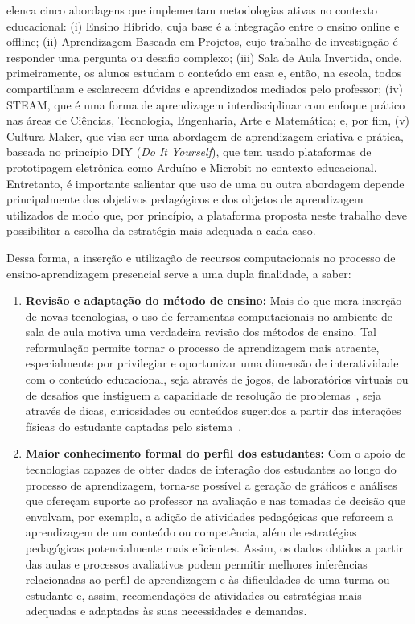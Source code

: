 \cite{Andrade:2018} elenca cinco abordagens que implementam metodologias ativas no contexto educacional: (i) Ensino Híbrido, cuja base é a integração entre o ensino online e offline; (ii) Aprendizagem Baseada em Projetos, cujo trabalho de investigação é responder uma pergunta ou desafio complexo; (iii) Sala de Aula Invertida, onde, primeiramente, os alunos estudam o conteúdo em casa e, então, na escola, todos compartilham e esclarecem dúvidas e aprendizados mediados pelo professor; (iv) STEAM, que é uma forma de aprendizagem interdisciplinar com enfoque prático nas áreas de Ciências, Tecnologia, Engenharia, Arte e Matemática; e, por fim, (v) Cultura Maker, que visa ser uma abordagem de aprendizagem criativa e prática, baseada no princípio DIY (\textit{Do It Yourself}), que tem usado plataformas de prototipagem eletrônica como Arduíno e Microbit no contexto educacional. Entretanto, é importante salientar que uso de uma ou outra abordagem depende principalmente dos objetivos pedagógicos e dos objetos de aprendizagem utilizados de modo que, por princípio, a plataforma proposta neste trabalho deve possibilitar a escolha da estratégia mais adequada a cada caso.

Dessa forma, a inserção e utilização de recursos computacionais no processo de ensino-aprendizagem presencial serve a uma dupla finalidade, a saber:

\begin{enumerate}
	\item \textbf{Revisão e adaptação do método de ensino:} Mais do que mera inserção de novas tecnologias, o uso de ferramentas computacionais no ambiente de sala de aula motiva uma verdadeira revisão dos métodos de ensino. Tal reformulação permite tornar o processo de aprendizagem mais atraente, especialmente por privilegiar e oportunizar uma dimensão de interatividade com o conteúdo educacional, seja através de jogos, de laboratórios virtuais ou de desafios que instiguem a capacidade de resolução de problemas~\citep{Sousa:2011,Chang:2014,Hwang:2009,Dekdouk:2012}, seja através de dicas, curiosidades ou conteúdos sugeridos a partir das interações físicas do estudante captadas pelo sistema~\citep{Santos:2014}.
	
	\item \textbf{Maior conhecimento formal do perfil dos estudantes:} Com o apoio de tecnologias capazes de obter dados de interação dos estudantes ao longo do processo de aprendizagem, torna-se possível a geração de gráficos e análises que ofereçam suporte ao professor na avaliação e nas tomadas de decisão que envolvam, por exemplo, a adição de atividades pedagógicas que reforcem a aprendizagem de um conteúdo ou competência, além de estratégias pedagógicas potencialmente mais eficientes. Assim, os dados obtidos a partir das aulas e processos avaliativos podem permitir melhores inferências relacionadas ao perfil de aprendizagem e às dificuldades de uma turma ou estudante e, assim, recomendações de atividades ou estratégias mais adequadas e adaptadas às suas necessidades e demandas.
\end{enumerate}

